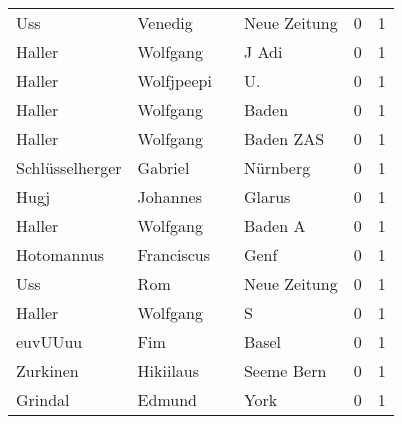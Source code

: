 \documentclass[10pt,a4paper,landscape]{article}
\begin{document}
\begin{longtable}{llllrr}
                      Uss &                            Venedig &             &                                Neue Zeitung &          0 &         1 \\
                   Haller &                           Wolfgang &             &                                       J Adi &          0 &         1 \\
                   Haller &                         Wolfjpeepi &             &                                         U.  &          0 &         1 \\
                   Haller &                           Wolfgang &             &                                       Baden &          0 &         1 \\
                   Haller &                           Wolfgang &             &                                   Baden ZAS &          0 &         1 \\
          Schlüsselherger &                            Gabriel &             &                                    Nürnberg &          0 &         1 \\
                     Hugj &                           Johannes &             &                                      Glarus &          0 &         1 \\
                   Haller &                           Wolfgang &             &                                     Baden A &          0 &         1 \\
               Hotomannus &                         Franciscus &             &                                        Genf &          0 &         1 \\
                      Uss &                                Rom &             &                                Neue Zeitung &          0 &         1 \\
                   Haller &                           Wolfgang &             &                                           S &          0 &         1 \\
                  euvUUuu &                                Fim &             &                                       Basel &          0 &         1 \\
                 Zurkinen &                          Hikiilaus &             &                                  Seeme Bern &          0 &         1 \\
                  Grindal &                             Edmund &             &                                        York &          0 &         1 \\

\end{longtable}
\end{document}
